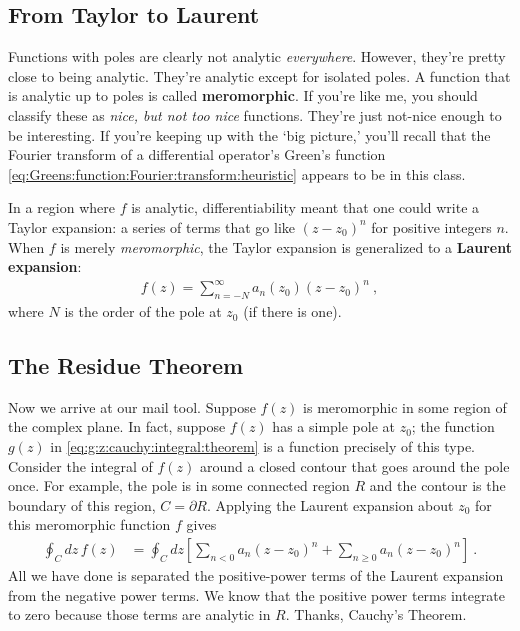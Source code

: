 \subsection{From Taylor to Laurent}

Functions with poles are clearly not analytic \emph{everywhere}. However, they're pretty close to being analytic. They're analytic except for isolated poles. A function that is analytic up to poles is called \textbf{meromorphic}. If you're like me, you should classify these as \emph{nice, but not too nice} functions. They're just not-nice enough to be interesting. If you're keeping up with the `big picture,' you'll recall that the Fourier transform of a differential operator's Green's function  \eqref{eq:Greens:function:Fourier:transform:heuristic} appears to be in this class.

In a region where $f$ is analytic, differentiability meant that one could write a Taylor expansion: a series of terms that go like $(z-z_0)^n$ for positive integers $n$. When $f$ is merely \emph{meromorphic}, the Taylor expansion is generalized to a \textbf{Laurent expansion}:
\begin{align}
	f(z) = \sum_{n=-N}^\infty  a_n(z_0) (z-z_0)^n \ ,
\end{align}
where $N$ is the order of the pole at $z_0$ (if there is one). 

\subsection{The Residue Theorem}

Now we arrive at our mail tool. Suppose $f(z)$ is meromorphic in some region of the complex plane. In fact, suppose $f(z)$ has a simple pole at $z_0$; the function $g(z)$ in \eqref{eq:g:z:cauchy:integral:theorem} is a function precisely of this type. Consider the integral of $f(z)$ around a closed contour that goes around the pole once. For example, the pole is in some connected region $R$ and the contour is the boundary of this region, $C=\partial R$. Applying the Laurent expansion about $z_0$ for this meromorphic function $f$ gives
\begin{align}
	\oint_C dz\, f(z) &= \oint_C dz 
	\left[
	\sum_{n<0} a_n (z-z_0)^n + \sum_{n\geq 0} a_n (z-z_0)^n
	\right] \ .
\end{align}
All we have done is separated the positive-power terms of the Laurent expansion from the negative power terms. We know that the positive power terms integrate to zero because those terms are analytic in $R$. Thanks, Cauchy's Theorem.

